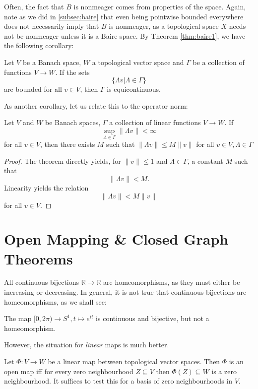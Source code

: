 \documentclass[twoside,symmetric, openany, 12pt]{./tuftebook}
\theoremstyle{definition}
\theoremstyle{definition}
\theoremstyle{definition}
\newcommand{\R}{\mathbb{R}}
\begin{document}
Often, the fact that $B$ is nonmeager comes from properties of the space. Again, note as we did in \ref{subsec:baire} that even being pointwise bounded everywhere does not necessarily imply that $B$ is nonmeager, as a topological space $X$ needs not be nonmeager unless it is a Baire space. By Theorem \ref{thm:baire1}, we have the following corollary:
\begin{Corollary}
	Let $V$ be a Banach space, $W$ a topological vector space and $\Gamma$ be a collection of functions $V\to W$. If the sets
	\[\{\Lambda v| \Lambda\in \Gamma\}\]
	are bounded for all $v\in V$, then $\Gamma$ is equicontinuous. 
\end{Corollary}
As another corollary, let us relate this to the operator norm:
\begin{Corollary}
	Let $V$ and $W$ be Banach spaces, $\Gamma$ a collection of linear functions $V\to W$. If
	\[\sup_{\Lambda\in \Gamma}\| \Lambda v\| < \infty\]
	for all $v\in V$, then there exists $M$ such that $\| \Lambda v\| \le M \|v\|$ for all $v\in V, \Lambda\in \Gamma$
\end{Corollary}
\begin{proof}
	The theorem directly yields, for $\|v \| \le 1$ and $\Lambda\in \Gamma$, a constant $M$ such that
	\[\|\Lambda v\| < M.\]
	Linearity yields the relation
	\[\| \Lambda v\| < M \|v\|\]
	for all $v\in V$.
\end{proof}

\section{Open Mapping \& Closed Graph Theorems}
All continuous bijections $\R \to \R$ are homeomorphisms, as they must either be increasing or decreasing. In general, it is not true that continuous bijections are homeomorphisms, as we shall see:
\begin{Example}
	The map $[0,2\pi)\to S^1, t\mapsto e^{it}$ is continuous and bijective, but not a homeomorphism.
\end{Example}
However, the situation for \emph{linear} maps is much better.
\begin{Theorem}
	Let $\Phi:V\to W$ be a linear map between topological vector spaces. Then $\Phi$ is an open map iff for every zero neighbourhood $Z\subseteq V$ then $\Phi(Z)\subseteq W$ is a zero neighbourhood. It suffices to test this for a basis of zero neighbourhoods in $V$.
\end{Theorem}
\end{document}
